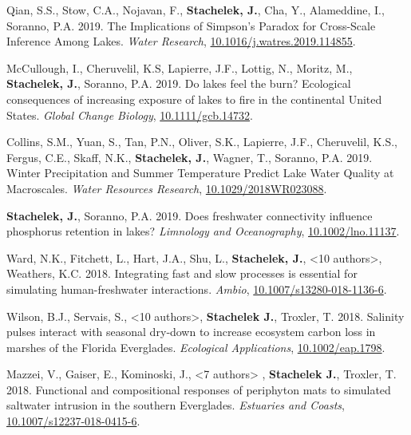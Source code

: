 \documentclass[11pt]{article}
\makeatletter
\newlength{\bibhang}
\newlength{\bibsep}
 {\@listi \global\bibsep\itemsep \global\advance\bibsep by\parsep}
\newenvironment{bibenum*}
  {\renewcommand\labelenumi{[\theenumi]}%
   \etaremune[
     topsep=0pt,
     itemsep=\bibsep,
     parsep=0pt,partopsep=0pt,
     itemindent=-\bibhang,
     leftmargin={\bibhang+\widthof{[999]}}]}
  {\endetaremune}
\makeatother
\begin{document}
\begin{bibenum*}

\item Qian, S.S., Stow, C.A., Nojavan, F., \textbf{Stachelek, J.}, Cha, Y., Alameddine, I., Soranno, P.A. 2019. The Implications of Simpson's Paradox for Cross-Scale Inference Among Lakes. \emph{Water Research}, \href{https://doi.org/10.1016/j.watres.2019.114855}{10.1016/j.watres.2019.114855}.

\item McCullough, I., Cheruvelil, K.S, Lapierre, J.F., Lottig, N., Moritz, M., \textbf{Stachelek, J.}, Soranno, P.A. 2019. Do lakes feel the burn? Ecological consequences of increasing exposure of lakes to fire in the continental United States. \emph{Global Change Biology}, \href{https://doi.org/10.1111/gcb.14732}{10.1111/gcb.14732}.

\item Collins, S.M., Yuan, S., Tan, P.N., Oliver, S.K., Lapierre, J.F., Cheruvelil, K.S., Fergus, C.E., Skaff, N.K., \textbf{Stachelek, J.}, Wagner, T., Soranno, P.A. 2019. Winter Precipitation and Summer Temperature Predict Lake Water Quality at Macroscales. \emph{Water Resources Research}, \href{https://doi.org/10.1029/2018WR023088}{10.1029/2018WR023088}.

\item \textbf{Stachelek, J.}, Soranno, P.A. 2019. Does freshwater connectivity influence phosphorus retention in lakes? \emph{Limnology and Oceanography}, \href{https://doi.org/10.1002/lno.11137}{10.1002/lno.11137}.

\item Ward, N.K., Fitchett, L., Hart, J.A., Shu, L., \textbf{Stachelek, J.}, <10 authors>, Weathers, K.C. 2018. Integrating fast and slow processes is essential for simulating human-freshwater interactions. \emph{Ambio}, \href{https://doi.org/10.1007/s13280-018-1136-6}{10.1007/s13280-018-1136-6}.

  \item Wilson, B.J., Servais, S., <10 authors>, \textbf{Stachelek J.}, Troxler, T. 2018. Salinity pulses interact with seasonal dry‐down to increase ecosystem carbon loss in marshes of the Florida Everglades. \emph{Ecological Applications}, \href{https://doi.org/10.1002/eap.1798}{10.1002/eap.1798}.

  \item Mazzei, V., Gaiser, E., Kominoski, J., <7 authors> , \textbf{Stachelek J.}, Troxler, T. 2018. Functional and compositional responses of periphyton mats to simulated saltwater intrusion in the southern Everglades. \emph{Estuaries and Coasts}, \href{https://doi.org/10.1007/s12237-018-0415-6}{10.1007/s12237-018-0415-6}.


\end{bibenum*}
\end{document}
